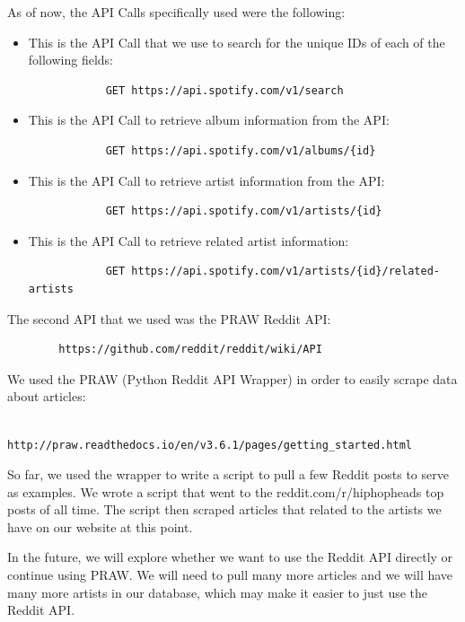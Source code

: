 \documentclass{scrartcl}
\begin{document}
    As of now, the API Calls specifically used were the following:

    \begin{itemize}
        \item This is the API Call that we use to search for the unique IDs of each of the following fields:
        \begin{verbatim}
            GET https://api.spotify.com/v1/search
        \end{verbatim}

        \item This is the API Call to retrieve album information from the API:
        \begin{verbatim}
            GET https://api.spotify.com/v1/albums/{id}
        \end{verbatim}

        \item This is the API Call to retrieve artist information from the API:
        \begin{verbatim}
            GET https://api.spotify.com/v1/artists/{id}
        \end{verbatim}

        \item This is the API Call to retrieve related artist information:
        \begin{verbatim}
            GET https://api.spotify.com/v1/artists/{id}/related-artists
        \end{verbatim}
    \end{itemize}

    \noindent
    The second API that we used was the PRAW Reddit API:
    \begin{verbatim}
        https://github.com/reddit/reddit/wiki/API
    \end{verbatim}

    \noindent
    We used the PRAW (Python Reddit API Wrapper) in order to easily scrape data about articles:
    \begin{verbatim}
        http://praw.readthedocs.io/en/v3.6.1/pages/getting_started.html
    \end{verbatim}

    So far, we used the wrapper to write a script to pull a few Reddit posts to serve as examples.
    We wrote a script that went to the reddit.com/r/hiphopheads top posts of all time.
    The script then scraped articles that related to the artists we have on our website at this point.

    In the future, we will explore whether we want to use the Reddit API directly or continue using PRAW.
    We will need to pull many more articles and we will have many more artists in our database, which may make it easier to just use the Reddit API.\\
\end{document}
